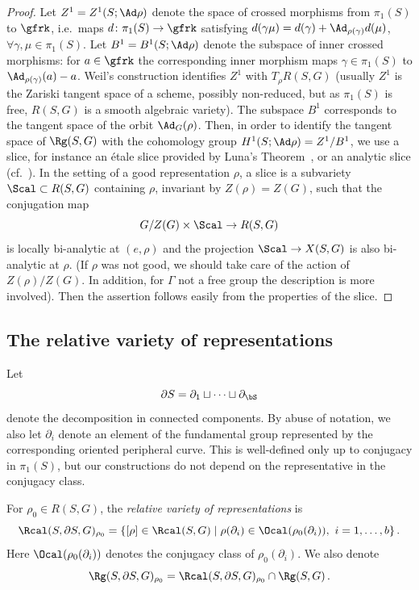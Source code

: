 \begin{proof}
Let $Z^1=Z^1(S;\Ad\rho)$ denote the space of crossed morphisms from $\pi_1(S)$ to $\gfrk$, i.e.~maps $d\colon \pi_1(S)\to \gfrk$ satisfying $d(\gamma\mu)=d(\gamma)+
\Ad_{\rho(\gamma)}d(\mu)$, $\forall\gamma,\mu\in\pi_1(S)$. Let $B^1=B^1(S;\Ad\rho)$ denote the subspace of inner crossed morphisms: for $a\in\gfrk$ the corresponding inner morphism maps $\gamma\in\pi_1(S)$ to $\Ad_{\rho(\gamma)}(a)-a$. Weil's construction identifies $Z^1$ with $T_{\rho}R(S,G)$ (usually $Z^1$ is the Zariski tangent space of a scheme, possibly non-reduced, but as $\pi_1(S)$ is free, $R(S,G)$ is a smooth algebraic variety). The subspace $B^1$ corresponds to the tangent space of the orbit $\Ad_G(\rho)$. Then, in order to identify the tangent space of $\Rg(S,G)$ with the cohomology group $ H^1(S;\Ad\rho)=Z^1/B^1 $, we use a slice, for instance an étale slice provided by Luna's Theorem~\cite[Theorem~6.1]{AlgebraicGeometryIV}, or an analytic slice (cf.~\cite{JohnsonMillson}). In the setting of a good representation $\rho$, a slice is a subvariety $\Scal\subset R(S,G)$ containing $\rho$, invariant by $Z(\rho)=Z(G)$, such that the conjugation map
\[
G/Z(G)\times \Scal\to R(S,G)
\]
is locally bi-analytic at $(e,\rho)$ and the projection $\Scal\to X(S,G)$ is also bi-analytic at $\rho$. (If $\rho$ was not good, we should take care of the action of $Z(\rho)/Z(G)$. In addition, for $\Gamma$ not a free group the description is more involved). Then the assertion follows easily from the properties of the slice.
\end{proof}


\subsection{The relative variety of representations}\label{subssec:relative}
Let
\[
\partial S=\partial_1\sqcup\dots\sqcup \partial_\bS
\]
denote the decomposition in connected components. By abuse of notation, we also let $\partial_i$ denote an element of the fundamental group represented by the corresponding oriented peripheral curve. This is well-defined only up to conjugacy in $\pi_1(S)$, but our constructions do not depend on the representative in the conjugacy class.

\begin{defi}
For $\rho_0\in R(S,G)$, the
\emph{relative variety of representations} is
\[
\Rcal(S,\partial S,G)_{\rho_0}=\{[\rho]\in \Rcal(S,G)\mid \rho(\partial_i)\in\Ocal(\rho_0(\partial_i)),\ i=1,\dots,b\}\,.
\]
Here $\Ocal (\rho_0(\partial_i))$ denotes the conjugacy class of $\rho_0(\partial_i)$. We also denote
\[
\Rg(S,\partial S,G)_{\rho_0}=\Rcal(S,\partial S,G)_{\rho_0}\cap \Rg(S,G)\,.
\]
\end{defi}


